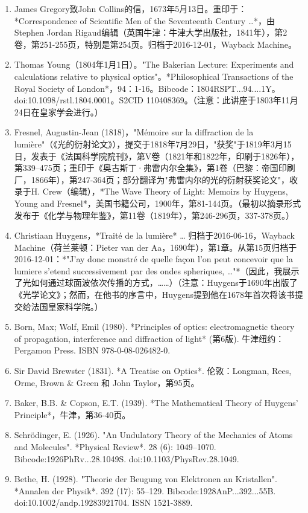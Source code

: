 \begin{enumerate}
\item James Gregory致John Collins的信，1673年5月13日。重印于：*Correspondence of Scientific Men of the Seventeenth Century …*，由Stephen Jordan Rigaud编辑（英国牛津：牛津大学出版社，1841年），第2卷，第251-255页，特别是第254页。归档于2016-12-01，Wayback Machine。
\item Thomas Young（1804年1月1日）。"The Bakerian Lecture: Experiments and calculations relative to physical optics"。*Philosophical Transactions of the Royal Society of London*，94：1-16。Bibcode：1804RSPT...94....1Y。doi:10.1098/rstl.1804.0001。S2CID 110408369。（注意：此讲座于1803年11月24日在皇家学会进行。）
\item Fresnel, Augustin-Jean (1818)，"Mémoire sur la diffraction de la lumière"（《光的衍射论文》），提交于1818年7月29日，"获奖"于1819年3月15日，发表于《法国科学院院刊》，第V卷（1821年和1822年，印刷于1826年），第339–475页；重印于《奥古斯丁·弗雷内尔全集》，第1卷（巴黎：帝国印刷厂，1866年），第247-364页；部分翻译为"弗雷内尔的光的衍射获奖论文"，收录于H. Crew（编辑），*The Wave Theory of Light: Memoirs by Huygens, Young and Fresnel*，美国书籍公司，1900年，第81-144页。（最初以摘录形式发布于《化学与物理年鉴》，第11卷（1819年），第246-296页，337-378页。）
\item Christiaan Huygens，*Traité de la lumière* … 归档于2016-06-16，Wayback Machine（荷兰莱顿：Pieter van der Aa，1690年），第1章。从第15页归档于2016-12-01：*"J'ay donc monstré de quelle façon l'on peut concevoir que la lumiere s'etend successivement par des ondes spheriques, …"*（因此，我展示了光如何通过球面波依次传播的方式，……）（注意：Huygens于1690年出版了《光学论文》；然而，在他书的序言中，Huygens提到他在1678年首次将该书提交给法国皇家科学院。）
\item Born, Max; Wolf, Emil (1980). *Principles of optics: electromagnetic theory of propagation, interference and diffraction of light* (第6版). 牛津纽约：Pergamon Press. ISBN 978-0-08-026482-0.
\item Sir David Brewster (1831). *A Treatise on Optics*. 伦敦：Longman, Rees, Orme, Brown & Green 和 John Taylor，第95页。
\item Baker, B.B. & Copson, E.T. (1939). *The Mathematical Theory of Huygens' Principle*，牛津，第36-40页。
\item Schrödinger, E. (1926). "An Undulatory Theory of the Mechanics of Atoms and Molecules". *Physical Review*. 28 (6): 1049–1070. Bibcode:1926PhRv...28.1049S. doi:10.1103/PhysRev.28.1049.
\item Bethe, H. (1928). "Theorie der Beugung von Elektronen an Kristallen". *Annalen der Physik*. 392 (17): 55–129. Bibcode:1928AnP...392...55B. doi:10.1002/andp.19283921704. ISSN 1521-3889.

\end{enumerate}
